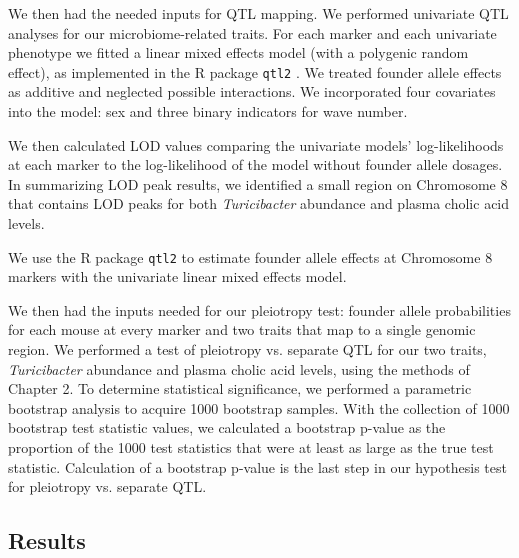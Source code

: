 \documentclass[oneside]{book}\usepackage[]{graphicx}\usepackage[]{color}
\begin{document}
We then had the needed inputs for QTL mapping. 
We performed univariate QTL analyses for our microbiome-related 
traits. 
For each marker and each univariate phenotype we fitted a linear mixed effects model (with a polygenic random effect), 
as implemented in the R package \texttt{qtl2} \citep{broman2019rqtl2}. 
We treated founder allele effects as additive and neglected possible interactions. 
We incorporated four covariates into the model: sex and three binary indicators for wave number. 



We then calculated LOD values comparing the univariate models' 
log-likelihoods at each marker to the log-likelihood of 
the model without founder allele dosages. 
In summarizing LOD peak results, we identified a 
small region on Chromosome 8 that contains LOD peaks for both 
\emph{Turicibacter} abundance and plasma cholic acid levels.



We use the R package \texttt{qtl2} to estimate founder allele effects 
at Chromosome 8 markers with
the univariate linear mixed effects model. 



We then had the inputs needed for our pleiotropy test: 
founder allele probabilities for each mouse at every 
marker and two traits that map to a single genomic region. 
We performed a test of pleiotropy vs. separate QTL for our two traits, 
\emph{Turicibacter} abundance and plasma cholic acid levels, 
using the methods of Chapter 2. 
To determine statistical significance, we performed a 
parametric bootstrap analysis to acquire 1000 bootstrap samples. 
With the collection of 1000 bootstrap test statistic values, we calculated a 
bootstrap p-value as the proportion of the 1000 test statistics
that were at least as large as the true test statistic. 
Calculation of a bootstrap p-value is the last step in our hypothesis test for pleiotropy vs. separate QTL.



\subsection{Results}
\end{document}
